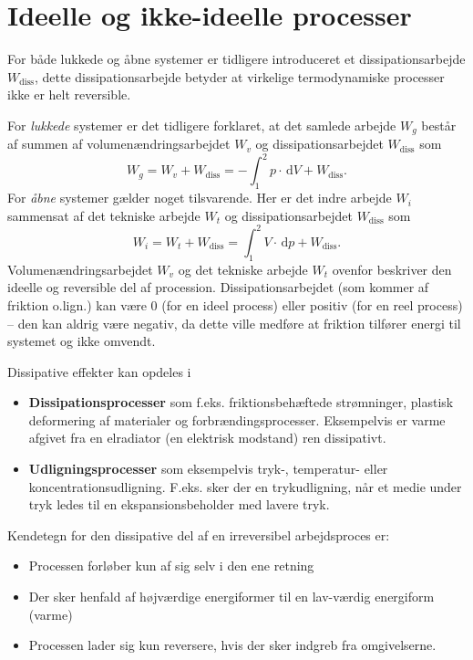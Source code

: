 
\section{Ideelle og ikke-ideelle processer}
For både lukkede og åbne systemer er tidligere introduceret et dissipationsarbejde $W_{\mathrm{diss}}$, dette dissipationsarbejde betyder at virkelige termodynamiske processer ikke er helt reversible.

For \textit{lukkede} systemer er det tidligere forklaret, at det samlede arbejde $W_g$ består af summen af volumenændringsarbejdet $W_v$ og dissipationsarbejdet $W_{\mathrm{diss}}$ som
\[ 
W_g = W_v + W_{\mathrm{diss}} = - \int_{1}^{2} p \cdot \, \mathrm{d}V + W_{\mathrm{diss}}
.\]
For \textit{åbne} systemer gælder noget tilsvarende. Her er det indre arbejde $W_i$ sammensat af det tekniske arbejde $W_t$ og dissipationsarbejdet $W_{\mathrm{diss}}$ som
\[ 
W_i = W_t + W_{\mathrm{diss}} = \int_{1}^{2} V \cdot \, \mathrm{d}p + W_{\mathrm{diss}}
.\]
Volumenændringsarbejdet $W_v$ og det tekniske arbejde $W_t$ ovenfor beskriver den ideelle og reversible del af procession. Dissipationsarbejdet (som kommer af friktion o.lign.) kan være 0 (for en ideel process) eller positiv (for en reel process) -- den kan aldrig være negativ, da dette ville medføre at friktion tilfører energi til systemet og ikke omvendt.

Dissipative effekter kan opdeles i
\begin{itemize}
  \item \textbf{Dissipationsprocesser} som f.eks. friktionsbehæftede strømninger, plastisk deformering af materialer og forbrændingsprocesser. Eksempelvis er varme afgivet fra en elradiator (en elektrisk modstand) ren dissipativt.
  \item \textbf{Udligningsprocesser} som eksempelvis tryk-, temperatur- eller koncentrationsudligning. F.eks. sker der en trykudligning, når et medie under tryk ledes til en ekspansionsbeholder med lavere tryk.
\end{itemize}

Kendetegn for den dissipative del af en irreversibel arbejdsproces er:
\begin{itemize}
  \item Processen forløber kun af sig selv i den ene retning
  \item Der sker henfald af højværdige energiformer til en lav-værdig energiform (varme)
  \item Processen lader sig kun reversere, hvis der sker indgreb fra omgivelserne.
\end{itemize}


